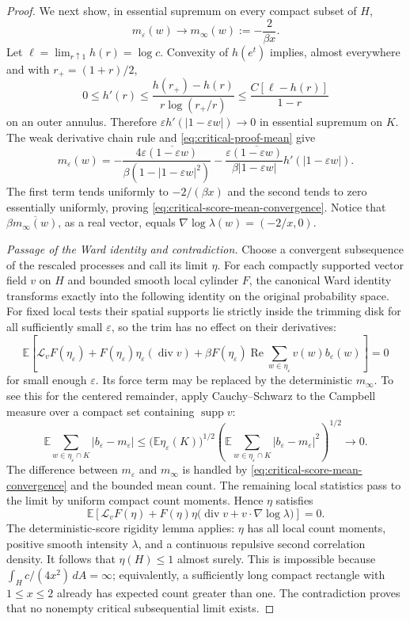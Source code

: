 \documentclass[11pt,a4paper]{article}
\numberwithin{equation}{section}
\theoremstyle{definition}
\theoremstyle{remark}
\newcommand{\E}{\mathbb E}
\newcommand{\supp}{\operatorname{supp}}
\begin{document}
\begin{proof}
We next show, in essential supremum on every compact subset of $H$,
\begin{equation}\label{eq:critical-score-mean-convergence}
 m_\varepsilon(w)\longrightarrow
       m_\infty(w):=-\frac2{\beta x}.
\end{equation}
Let $\ell=\lim_{r\uparrow1}h(r)=\log c$. Convexity of $h(e^t)$
implies, almost everywhere and with $r_+=(1+r)/2$,
\[
 0\le h'(r)
 \le\frac{h(r_+)-h(r)}{r\log(r_+/r)}
 \le\frac{C[\ell-h(r)]}{1-r}
\]
on an outer annulus. Therefore
$\varepsilon h'(|1-\varepsilon w|)\to0$ in essential supremum on $K$.
The weak derivative chain rule and
\eqref{eq:critical-proof-mean} give
\[
 m_\varepsilon(w)
 =-\frac{4\varepsilon\overline{(1-\varepsilon w)}}
            {\beta(1-|1-\varepsilon w|^2)}
   -\frac{\varepsilon\overline{(1-\varepsilon w)}}
            {\beta|1-\varepsilon w|}
                         h'(|1-\varepsilon w|).
\]
The first term tends uniformly to $-2/(\beta x)$ and the second tends
to zero essentially uniformly, proving
\eqref{eq:critical-score-mean-convergence}. Notice that
$\beta\overline{m_\infty(w)}$, as a real vector, equals
$\nabla\log\lambda(w)=(-2/x,0)$.

\emph{Passage of the Ward identity and contradiction.}
Choose a convergent subsequence of the rescaled processes and call its
limit $\eta$. For each compactly supported vector field $v$ on $H$
and bounded smooth local cylinder $F$, the canonical Ward identity
transforms exactly into the following identity on the original
probability space. For fixed local tests their spatial supports lie
strictly inside the trimming disk for all sufficiently small
$\varepsilon$, so the trim has no effect on their derivatives:
\[
 \E\left[\mathcal L_vF(\eta_\varepsilon)
 +F(\eta_\varepsilon)\eta_\varepsilon(\operatorname{div}v)
 +\beta F(\eta_\varepsilon)\operatorname{Re}
             \sum_{w\in\eta_\varepsilon}v(w)
                         b_\varepsilon(w)\right]=0
\]
for small enough $\varepsilon$. Its force term may be replaced by
the deterministic $m_\infty$. To see this for the centered remainder,
apply Cauchy--Schwarz to the Campbell measure over a compact set
containing $\supp v$:
\[
 \E\sum_{w\in\eta_\varepsilon\cap K}|b_\varepsilon-m_\varepsilon|
 \le\bigl(\E\eta_\varepsilon(K)\bigr)^{1/2}
      \left(\E\sum_{w\in\eta_\varepsilon\cap K}
                      |b_\varepsilon-m_\varepsilon|^2\right)^{1/2}
 \longrightarrow0.
\]
The difference between $m_\varepsilon$ and $m_\infty$ is handled by
\eqref{eq:critical-score-mean-convergence} and the bounded mean count.
The remaining local statistics pass to the limit by uniform compact
count moments. Hence $\eta$ satisfies
\[
 \E\left[\mathcal L_vF(\eta)
   +F(\eta)\eta\bigl(\operatorname{div}v
                          +v\cdot\nabla\log\lambda\bigr)\right]=0.
\]
The deterministic-score rigidity lemma applies: $\eta$ has all local
count moments, positive smooth intensity $\lambda$, and a continuous
repulsive second correlation density. It follows that $\eta(H)\le1$
almost surely. This is impossible because
$\int_H c/(4x^2)\,dA=\infty$; equivalently, a sufficiently long compact
rectangle with $1\le x\le2$ already has expected count greater than one.
The contradiction proves that no nonempty critical subsequential
limit exists.


\end{proof}
\end{document}
